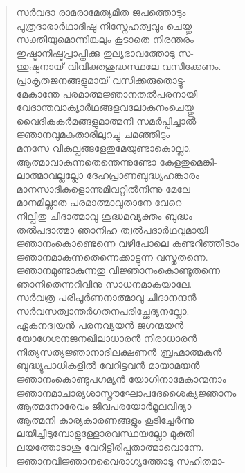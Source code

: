 \begin{verse}
സര്‍വദാ രാമരാമേത്യമിത ജപത്തൊടും\\
പുത്രദാരാര്‍ഥാദിഷു നിസ്നേഹത്വവും ചെയ്തു\\
സക്തിയുമൊന്നിങ്കലും കൂടാതെ നിരന്തരം\\
ഇഷ്ടാനിഷ്ടപ്രാപ്തിക്കു തുല്യഭാവത്തോടു സ-\\
ന്തുഷ്ടനായ് വിവിക്തശുദ്ധസ്ഥലേ വസിക്കേണം.\\
പ്രാകൃതജനങ്ങളുമായ് വസിക്കരുതൊട്ടു-\\
മേകാന്തേ പരമാത്മജ്ഞാനതല്‍പരനായി\\
വേദാന്തവാക്യാര്‍ഥങ്ങളവലോകനംചെയ്തു\\
വൈദികകര്‍മങ്ങളുമാത്മനി സമര്‍പ്പിച്ചാല്‍\\
ജ്ഞാനവുമകതാരിലുറച്ചു ചമഞ്ഞീടും\\
മനസേ വികല്പങ്ങളേതുമേയുണ്ടാകൊല്ലാ.\\
ആത്മാവാകുന്നതെന്തെന്നുണ്ടോ കേളതുമെങ്കി-\\
ലാത്മാവല്ലല്ലോ ദേഹപ്രാണബുദ്ധ്യഹങ്കാരം\\
മാനസാദികളൊന്നുമിവറ്റില്‍നിന്നു മേലേ\\
മാനമില്ലാത പരമാത്മാവുതാനേ വേറെ\\
നില്പിതു ചിദാത്മാവു ശുദ്ധമവ്യക്തം ബുദ്ധം\\
തല്‍പദാത്മാ ഞാനിഹ ത്വല്‍പദാര്‍ഥവുമായി\\
ജ്ഞാനംകൊണ്ടെന്നെ വഴിപോലെ കണ്ടറിഞ്ഞീടാം\\
ജ്ഞാനമാകുന്നതെന്നെക്കാട്ടുന്ന വസ്തുതന്നെ.\\
ജ്ഞാനമുണ്ടാകുന്നതു വിജ്ഞാനംകൊണ്ടുതന്നെ\\
ഞാനിതെന്നറിവിനു സാധനമാകയാലേ.\\
സര്‍വത്ര പരിപൂര്‍ണനാത്മാവു ചിദാനന്ദന്‍\\
സര്‍വസത്വാന്തര്‍ഗതനപരിച്ഛേദ്യനല്ലോ.\\
ഏകനദ്വയന്‍ പരനവ്യയന്‍ ജഗന്മയന്‍\\
യോഗേശനജനഖിലാധാരന്‍ നിരാധാരന്‍\\
നിത്യസത്യജ്ഞാനാദിലക്ഷണന്‍ ബ്രഹ്മാത്മകന്‍\\
ബുദ്ധ്യുപാധികളില്‍ വേറിട്ടവന്‍ മായാമയന്‍\\
ജ്ഞാനംകൊണ്ടുപഗമ്യന്‍ യോഗിനാമേകാന്മനാം\\
ജ്ഞാനമാചാര്യശാസ്ത്രൗഘോപദേശൈക്യജ്ഞാനം\\
ആത്മനോരേവം ജീവപരയോര്‍മൂലവിദ്യാ\\
ആത്മനി കാര്യകാരണങ്ങളും കൂടിച്ചേര്‍ന്നു\\
ലയിച്ചീടുമ്പോളുള്ളോരവസ്ഥയല്ലോ മുക്തി\\
ലയത്തോടാശു വേറിട്ടിരിപ്പതാത്മാവൊന്നേ.\\
ജ്ഞാനവിജ്ഞാനവൈരാഗ്യത്തോടു സഹിതമാ-\\

\end{verse}
